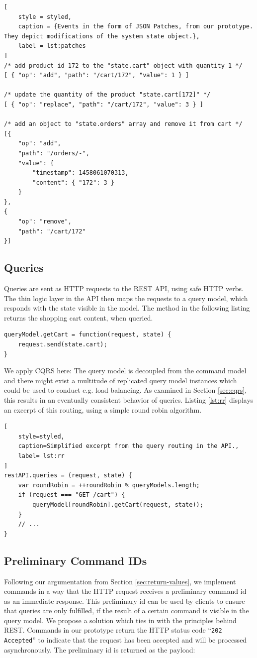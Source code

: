 \begin{lstlisting}[
	style = styled, 
	caption = {Events in the form of JSON Patches, from our prototype. They depict modifications of the system state object.},
	label = lst:patches
]
/* add product id 172 to the "state.cart" object with quantity 1 */
[ { "op": "add", "path": "/cart/172", "value": 1 } ]

/* update the quantity of the product "state.cart[172]" */
[ { "op": "replace", "path": "/cart/172", "value": 3 } ]

/* add an object to "state.orders" array and remove it from cart */
[{
	"op": "add",
	"path": "/orders/-",
	"value": {
		"timestamp": 1458061070313,
		"content": { "172": 3 }
	}
}, 
{
	"op": "remove",
	"path": "/cart/172"
}]
\end{lstlisting}

\subsection{Queries}
Queries are sent as HTTP requests to the REST API, using safe HTTP verbs. 
The thin logic layer in the API then maps the requests to a query model, which 
responds with the state visible in the model.
The method in the following listing returns the shopping cart content, when queried.

\begin{lstlisting}[style=styled]
queryModel.getCart = function(request, state) {
	request.send(state.cart);
}
\end{lstlisting}

We apply CQRS here: The query model is decoupled from the command model and 
there might exist a multitude of replicated query model instances which
could be used to conduct e.g. load balancing. 
As examined in Section \ref{sec:cqrs}, this results in an eventually consistent 
behavior of queries.
Listing \ref{lst:rr} displays an excerpt of this routing, using a simple round 
robin algorithm.

\begin{lstlisting}[
	style=styled, 
	caption=Simplified excerpt from the query routing in the API.,
	label= lst:rr
]
restAPI.queries = (request, state) {
	var roundRobin = ++roundRobin % queryModels.length;
	if (request === "GET /cart") {
		queryModel[roundRobin].getCart(request, state));
	}
	// ...
}
\end{lstlisting}

\subsection{Preliminary Command IDs}
\label{sec:prelim}
Following our argumentation from Section \ref{sec:return-values}, we implement 
commands in a way that the HTTP request receives a preliminary command id as an
immediate response. 
This preliminary id can be used by clients to ensure that queries are only 
fulfilled, if the result of a certain command is visible in the query model. 
%
We propose a solution which ties in with the principles behind REST.
Commands in our prototype return the HTTP status code ``\texttt{202 Accepted}'' 
to indicate that the request has been accepted and will be processed
asynchronously. The preliminary id is returned as the payload:

